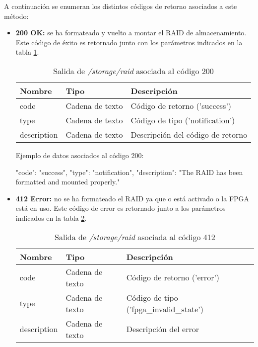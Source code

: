 A continuación se enumeran los distintos códigos de retorno asociados a este método:
\begin{itemize}

\item{\textbf{200 OK:} se ha formateado y vuelto a montar el \gls{RAID} de almacenamiento. Este código de éxito es retornado junto con los parámetros indicados en la tabla \ref{extra:api:storageraid:ok}.
\begin{table}[H]
\centering
\begin{tabular}{|l|l|l|}
\hline
\rowcolor[HTML]{F5F5F5}
\textbf{Nombre}  & \textbf{Tipo}   & \textbf{Descripción}              \\ \hline
code             & Cadena de texto & Código de retorno ('success')     \\ \hline
type             & Cadena de texto & Código de tipo ('notification')   \\ \hline
description      & Cadena de texto & Descripción del código de retorno \\ \hline
\end{tabular}
\caption{Salida de \textit{/storage/raid} asociada al código 200}
\label{extra:api:storageraid:ok}
\end{table}
\begin{minipage}{\textwidth}
Ejemplo de datos asociados al código 200:

\begin{code}[language=json]
{
  "code": "success",
  "type": "notification",
  "description": "The RAID has been formatted and mounted properly."
}
\end{code}
\end{minipage}
}

\item{\textbf{412 Error:} no se ha formateado el \gls{RAID} ya que o está activado o la \gls{FPGA} está en uso. Este código de error es retornado junto a los parámetros indicados en la tabla \ref{extra:api:storageraid:error}.
\begin{table}[H]
\centering
\begin{tabular}{|l|l|l|}
\hline
\rowcolor[HTML]{F5F5F5}
\textbf{Nombre}  & \textbf{Tipo}   & \textbf{Descripción}                    \\ \hline
code             & Cadena de texto & Código de retorno ('error')             \\ \hline
type             & Cadena de texto & Código de tipo ('fpga\_invalid\_state') \\ \hline
description      & Cadena de texto & Descripción del error                   \\ \hline
\end{tabular}
\caption{Salida de \textit{/storage/raid} asociada al código 412}
\label{extra:api:storageraid:error}
\end{table}

}
\end{itemize}
